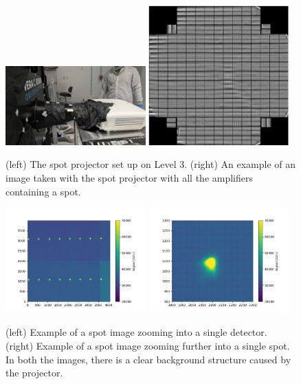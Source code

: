 \begin{figure}[htbp]
\centering
\includegraphics[width=0.48\textwidth]{figures/SpotProjector_Level3.jpg}
\includegraphics[width=0.48\textwidth]{figures/SpotProjector_FP.png}
\caption{(left) The spot projector set up on Level 3. (right) An example of an image taken with the spot projector with all the amplifiers containing a spot.}
\label{fig:SpotProjector_L3_FP}
\end{figure}

\begin{figure}[htbp]
\centering
\includegraphics[width=0.48\textwidth]{figures/Spot_Detector_Ex.png}
\includegraphics[width=0.48\textwidth]{figures/Spot_Spot_Ex.png}
\caption{(left) Example of a spot image zooming into a single detector. (right) Example of a spot image zooming further into a single spot. In both the images, there is a clear background structure caused by the projector.}
\label{fig:SpotProjector_Spots}
\end{figure}

